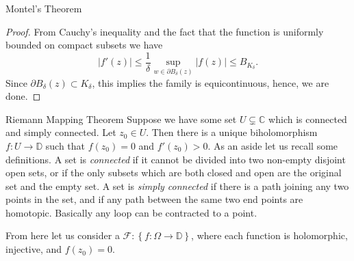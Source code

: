 \documentclass{article}
\begin{document}
\begin{thrm}{Montel's Theorem}{}
\begin{proof}
    From Cauchy's inequality and the fact that the function is uniformly bounded on compact subsets we have
    \[
        |f'(z)| \leq \frac{1}{\delta }\sup _{w\in \partial B_\delta (z)} |f(z)| \leq B_{K_\delta }. 
    \]
    Since \( \partial B_\delta (z) \subset K_\delta  \), this implies the family is equicontinuous, hence, we are done. 
\end{proof}

\end{thrm}

\begin{thrm}{Riemann Mapping Theorem}{}
Suppose we have some set \( U \subsetneq \mathbb{C}  \) which is connected and simply connected. Let \( z_0 \in U \). Then there is a unique biholomorphism \( f: U \to \mathbb{D}  \) such that \( f(z_0) = 0 \) and \( f'(z_0)>0 \). 
\tcbline
As an aside let us recall some definitions. A set is \emph{connected} if it cannot be divided into two non-empty disjoint open sets, or if the only subsets which are both closed and open are the original set and the empty set. A set is \emph{simply connected } if there is a path joining any two points in the set, and if any path between the same two end points are homotopic. Basically any loop can be contracted to a point.     
\end{thrm}

From here let us consider a \( \mathcal{F} : \left\{ f:\Omega \to \mathbb{D}  \right\}  \), where each function is holomorphic, injective, and \( f(z_0) = 0 \). 
\end{document}

